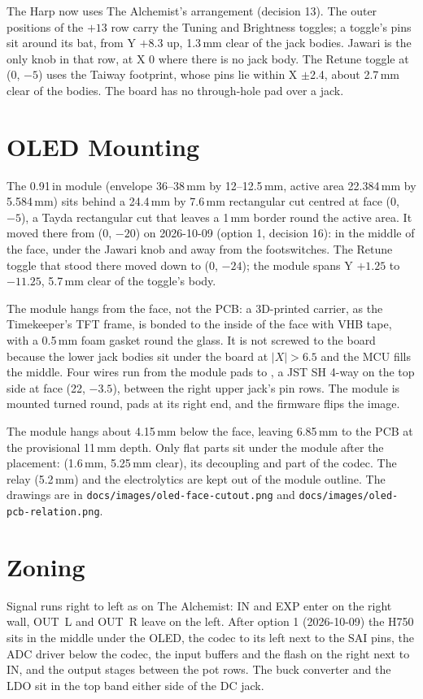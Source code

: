 The Harp now uses The Alchemist's arrangement (decision 13). The outer positions of the $+13$ row carry the Tuning and Brightness toggles; a toggle's pins sit around its bat, from Y $+8.3$ up, 1.3\,mm clear of the jack bodies. Jawari is the only knob in that row, at X 0 where there is no jack body. The Retune toggle at (0, $-5$) uses the Taiway footprint, whose pins lie within X $\pm$2.4, about 2.7\,mm clear of the bodies. The board has no through-hole pad over a jack.

\section{OLED Mounting}
The 0.91\,in module (envelope 36--38\,mm by 12--12.5\,mm, active area 22.384\,mm by 5.584\,mm) sits behind a 24.4\,mm by 7.6\,mm rectangular cut centred at face (0, $-5$), a Tayda rectangular cut that leaves a 1\,mm border round the active area. It moved there from (0, $-20$) on 2026-10-09 (option 1, decision 16): in the middle of the face, under the Jawari knob and away from the footswitches. The Retune toggle that stood there moved down to (0, $-24$); the module spans Y $+1.25$ to $-11.25$, 5.7\,mm clear of the toggle's body.

The module hangs from the face, not the PCB: a 3D-printed carrier, as the Timekeeper's TFT frame, is bonded to the inside of the face with VHB tape, with a 0.5\,mm foam gasket round the glass. It is not screwed to the board because the lower jack bodies sit under the board at $|X| > 6.5$ and the MCU fills the middle. Four wires run from the module pads to , a JST SH 4-way on the top side at face (22, $-3.5$), between the right upper jack's pin rows. The module is mounted turned round, pads at its right end, and the firmware flips the image.

The module hangs about 4.15\,mm below the face, leaving 6.85\,mm to the PCB at the provisional 11\,mm depth. Only flat parts sit under the module after the placement:  (1.6\,mm, 5.25\,mm clear), its decoupling and part of the codec. The relay  (5.2\,mm) and the electrolytics are kept out of the module outline. The drawings are in \texttt{docs/images/oled-face-cutout.png} and \texttt{docs/images/oled-pcb-relation.png}.

\section{Zoning}
Signal runs right to left as on The Alchemist: IN and EXP enter on the right wall, OUT~L and OUT~R leave on the left. After option 1 (2026-10-09) the H750 sits in the middle under the OLED, the codec to its left next to the SAI pins, the ADC driver below the codec, the input buffers and the flash on the right next to IN, and the output stages between the pot rows. The buck converter and the LDO sit in the top band either side of the DC jack.

